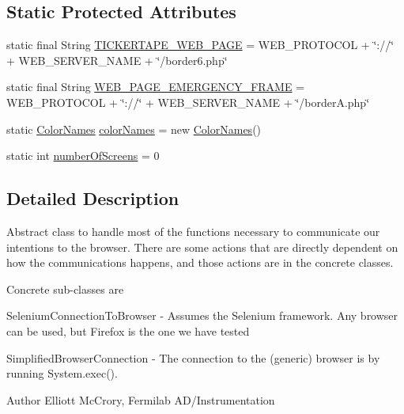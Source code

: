 \subsection*{Static Protected Attributes}
\begin{DoxyCompactItemize}
\item 
static final String \hyperlink{classgov_1_1fnal_1_1ppd_1_1dd_1_1display_1_1client_1_1ConnectionToBrowserInstance_a07f932b29a0bdeb7c0811fd0f815afbb}{T\-I\-C\-K\-E\-R\-T\-A\-P\-E\-\_\-\-W\-E\-B\-\_\-\-P\-A\-G\-E} = W\-E\-B\-\_\-\-P\-R\-O\-T\-O\-C\-O\-L + \char`\"{}\-://\char`\"{} + W\-E\-B\-\_\-\-S\-E\-R\-V\-E\-R\-\_\-\-N\-A\-M\-E + \char`\"{}/border6.\-php\char`\"{}
\item 
static final String \hyperlink{classgov_1_1fnal_1_1ppd_1_1dd_1_1display_1_1client_1_1ConnectionToBrowserInstance_a1081b866c3ae5aa9f6fe831ea3484d2c}{W\-E\-B\-\_\-\-P\-A\-G\-E\-\_\-\-E\-M\-E\-R\-G\-E\-N\-C\-Y\-\_\-\-F\-R\-A\-M\-E} = W\-E\-B\-\_\-\-P\-R\-O\-T\-O\-C\-O\-L + \char`\"{}\-://\char`\"{} + W\-E\-B\-\_\-\-S\-E\-R\-V\-E\-R\-\_\-\-N\-A\-M\-E + \char`\"{}/border\-A.\-php\char`\"{}
\item 
static \hyperlink{classgov_1_1fnal_1_1ppd_1_1dd_1_1util_1_1nonguiUtils_1_1ColorNames}{Color\-Names} \hyperlink{classgov_1_1fnal_1_1ppd_1_1dd_1_1display_1_1client_1_1ConnectionToBrowserInstance_a519ae3dcdae79f106e41b5d7887c992b}{color\-Names} = new \hyperlink{classgov_1_1fnal_1_1ppd_1_1dd_1_1util_1_1nonguiUtils_1_1ColorNames}{Color\-Names}()
\item 
static int \hyperlink{classgov_1_1fnal_1_1ppd_1_1dd_1_1display_1_1client_1_1ConnectionToBrowserInstance_a7366adfc07c9163c5f6efcbc0c3985b7}{number\-Of\-Screens} = 0
\end{DoxyCompactItemize}


\subsection{Detailed Description}
Abstract class to handle most of the functions necessary to communicate our intentions to the browser. There are some actions that are directly dependent on how the communications happens, and those actions are in the concrete classes. 

Concrete sub-\/classes are 
\begin{DoxyItemize}
\item Selenium\-Connection\-To\-Browser -\/ Assumes the Selenium framework. Any browser can be used, but Firefox is the one we have tested  
\item Simplified\-Browser\-Connection -\/ The connection to the (generic) browser is by running System.\-exec(). 
\begin{DoxyItemize}
\item 
\end{DoxyItemize}



\begin{DoxyAuthor}{Author}
Elliott Mc\-Crory, Fermilab A\-D/\-Instrumentation 
\end{DoxyAuthor}

\end{DoxyItemize}

